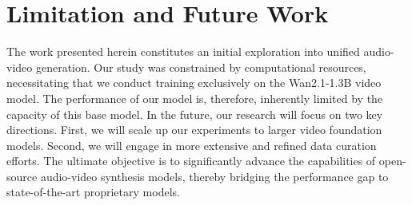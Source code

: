 \section{Limitation and Future Work}
The work presented herein constitutes an initial exploration into unified audio-video generation. Our study was constrained by computational resources, necessitating that we conduct training exclusively on the Wan2.1-1.3B video model. The performance of our model is, therefore, inherently limited by the capacity of this base model.
In the future, our research will focus on two key directions. First, we will scale up our experiments to larger video foundation models. Second, we will engage in more extensive and refined data curation efforts. The ultimate objective is to significantly advance the capabilities of open-source audio-video synthesis models, thereby bridging the performance gap to state-of-the-art proprietary models.